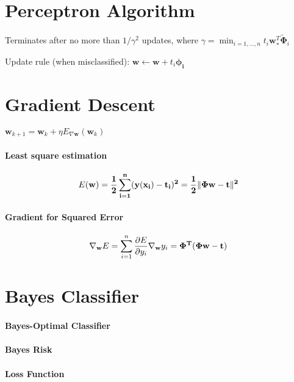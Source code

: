 \documentclass[9pt,fleqn]{scrartcl}
\begin{document}
\begin{multicols}{4}
\section{Perceptron Algorithm}
Terminates after no more than $1/\gamma^2$ updates, where 
$\gamma = \min_{i=1,\dots,n} t_i\mathbf{w}_*^T\mathbf{\tilde
\Phi}_i$

Update rule (when misclassified): $\mathbf{w} \leftarrow \mathbf{w} +
t_i\mathbf{\phi_i}$

\section{Gradient Descent}
$\mathbf{w}_{k+1} = \mathbf{w}_k + \eta E_{\nabla \mathbf w}(\mathbf{w}_k)$
\paragraph{Least square estimation}
$$E(\bf w) = \frac12 \sum_{i=1}^n(y(\bf x_i)-t_i)^2= \frac12 \|\bf\Phi\bf w- \bf t\|^2$$
\paragraph{Gradient for Squared Error}
$$\nabla_{\bf w}E= \sum_{i=1}^n\frac{\partial E}{\partial y_i} \nabla_{\bf w}y_i = \bf\Phi^T(\bf \Phi \bf w - \bf t)$$

\section{Bayes Classifier}
\paragraph{Bayes-Optimal Classifier}
\paragraph{Bayes Risk}
\paragraph{Loss Function}

\end{multicols}
\end{document}
